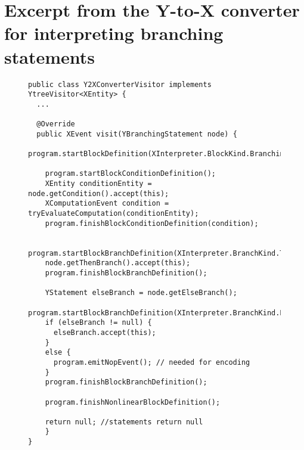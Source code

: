 \section{Excerpt from the Y-to-X converter for interpreting branching statements}
\label{apx:y2x}

\begin{figure}[H]
\begin{lstlisting}
public class Y2XConverterVisitor implements YtreeVisitor<XEntity> {
  ...

  @Override
  public XEvent visit(YBranchingStatement node) {
    program.startBlockDefinition(XInterpreter.BlockKind.Branching);

    program.startBlockConditionDefinition();
    XEntity conditionEntity = node.getCondition().accept(this);
    XComputationEvent condition = tryEvaluateComputation(conditionEntity);
    program.finishBlockConditionDefinition(condition);

    program.startBlockBranchDefinition(XInterpreter.BranchKind.Then);
    node.getThenBranch().accept(this);
    program.finishBlockBranchDefinition();

    YStatement elseBranch = node.getElseBranch();
    program.startBlockBranchDefinition(XInterpreter.BranchKind.Else);
    if (elseBranch != null) {
      elseBranch.accept(this);
    }
    else {
      program.emitNopEvent(); // needed for encoding
    }
    program.finishBlockBranchDefinition();

    program.finishNonlinearBlockDefinition();

    return null; //statements return null
    }
}
\end{lstlisting}
\end{figure}
